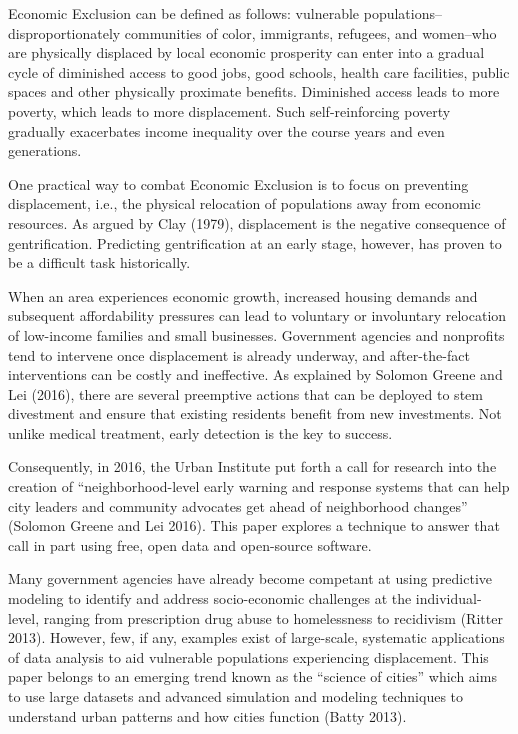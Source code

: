 \documentclass[12pt,]{article}
\begin{document}
Economic Exclusion can be defined as follows: vulnerable
populations--disproportionately communities of color, immigrants,
refugees, and women--who are physically displaced by local economic
prosperity can enter into a gradual cycle of diminished access to good
jobs, good schools, health care facilities, public spaces and other
physically proximate benefits. Diminished access leads to more poverty,
which leads to more displacement. Such self-reinforcing poverty
gradually exacerbates income inequality over the course years and even
generations.

One practical way to combat Economic Exclusion is to focus on preventing
displacement, i.e., the physical relocation of populations away from
economic resources. As argued by Clay (1979), displacement is the
negative consequence of gentrification. Predicting gentrification at an
early stage, however, has proven to be a difficult task historically.

When an area experiences economic growth, increased housing demands and
subsequent affordability pressures can lead to voluntary or involuntary
relocation of low-income families and small businesses. Government
agencies and nonprofits tend to intervene once displacement is already
underway, and after-the-fact interventions can be costly and
ineffective. As explained by Solomon Greene and Lei (2016), there are
several preemptive actions that can be deployed to stem divestment and
ensure that existing residents benefit from new investments. Not unlike
medical treatment, early detection is the key to success.

Consequently, in 2016, the Urban Institute put forth a call for research
into the creation of ``neighborhood-level early warning and response
systems that can help city leaders and community advocates get ahead of
neighborhood changes'' (Solomon Greene and Lei 2016). This paper
explores a technique to answer that call in part using free, open data
and open-source software.

Many government agencies have already become competant at using
predictive modeling to identify and address socio-economic challenges at
the individual-level, ranging from prescription drug abuse to
homelessness to recidivism (Ritter 2013). However, few, if any, examples
exist of large-scale, systematic applications of data analysis to aid
vulnerable populations experiencing displacement. This paper belongs to
an emerging trend known as the ``science of cities'' which aims to use
large datasets and advanced simulation and modeling techniques to
understand urban patterns and how cities function (Batty 2013).
\end{document}
